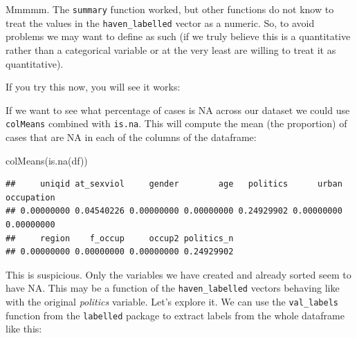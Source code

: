 \documentclass[
]{book}
\newenvironment{Shaded}{\begin{snugshade}}{\end{snugshade}}
\newcommand{\FunctionTok}[1]{\textcolor[rgb]{0.00,0.00,0.00}{#1}}
\newcommand{\NormalTok}[1]{#1}
\newcommand{\OtherTok}[1]{\textcolor[rgb]{0.56,0.35,0.01}{#1}}
\newcommand{\SpecialCharTok}[1]{\textcolor[rgb]{0.00,0.00,0.00}{#1}}
\begin{document}
Mmmmm. The \texttt{summary} function worked, but other functions do not know to treat the values in the \texttt{haven\_labelled} vector as a numeric. So, to avoid problems we may want to define as such (if we truly believe this is a quantitative rather than a categorical variable or at the very least are willing to treat it as quantitative).

\begin{Shaded}
\end{Shaded}

If you try this now, you will see it works:

\begin{Shaded}
\end{Shaded}

If we want to see what percentage of cases is NA across our dataset we could use \texttt{colMeans} combined with \texttt{is.na}. This will compute the mean (the proportion) of cases that are NA in each of the columns of the dataframe:

\begin{Shaded}
\begin{Highlighting}[]
\FunctionTok{colMeans}\NormalTok{(}\FunctionTok{is.na}\NormalTok{(df))}
\end{Highlighting}
\end{Shaded}

\begin{verbatim}
##     uniqid at_sexviol     gender        age   politics      urban occupation 
## 0.00000000 0.04540226 0.00000000 0.00000000 0.24929902 0.00000000 0.00000000 
##     region    f_occup     occup2 politics_n 
## 0.00000000 0.00000000 0.00000000 0.24929902
\end{verbatim}

This is suspicious. Only the variables we have created and already sorted seem to have NA. This may be a function of the \texttt{haven\_labelled} vectors behaving like with the original \emph{politics} variable. Let's explore it. We can use the \texttt{val\_labels} function from the \texttt{labelled} package to extract labels from the whole dataframe like this:
\end{document}
